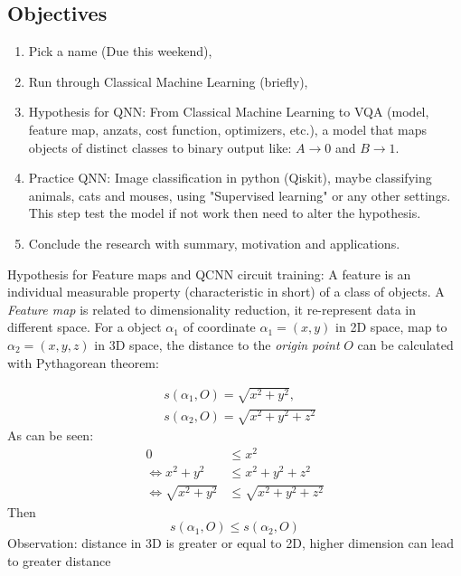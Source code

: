\subsection{Objectives}
\begin{enumerate}
    \item Pick a name (Due this weekend),
    \item Run through Classical Machine Learning (briefly),
    \item Hypothesis for QNN: From Classical Machine Learning to VQA (model, feature map, anzats, cost function, optimizers, etc.), a model that maps objects of distinct classes to binary output like: $A \to 0$ and $B \to 1$.
    \item Practice QNN: Image classification in python (Qiskit), maybe classifying animals, cats and mouses, using "Supervised learning" or any other settings. This step test the model if not work then need to alter the hypothesis.
    \item Conclude the research with summary, motivation and applications.
\end{enumerate}

Hypothesis for Feature maps and QCNN circuit training: A feature is an individual measurable property (characteristic in short) of a class of objects. A \textit{Feature map} is related to dimensionality reduction, it re-represent data in different space.
For a object $\alpha_1$ of coordinate $\alpha_1 = (x, y)$ in 2D space, map to $\alpha_2 = (x, y, z)$ in 3D space, the distance to the \textit{origin point} $O$ can be calculated with Pythagorean theorem:

\begin{equation}
    \begin{split}
        &s(\alpha_1, O) = \sqrt{x^2 + y^2}, \\
        &s(\alpha_2, O) = \sqrt{x^2 + y^2 + z^2}
    \end{split}
\end{equation}
As can be seen:
\begin{equation}
    \begin{split}
        0 &\leq x^2\\
        \iff x^2 + y^2 &\leq x^2 + y^2 + z^2 \\
        \iff \sqrt{x^2 + y^2} &\leq \sqrt{x^2 + y^2 + z^2}
    \end{split}
\end{equation}
Then
\begin{equation}
    s(\alpha_1, O) \leq s(\alpha_2, O)
\end{equation}
Observation: distance in 3D is greater or equal to 2D, higher dimension can lead to greater distance 